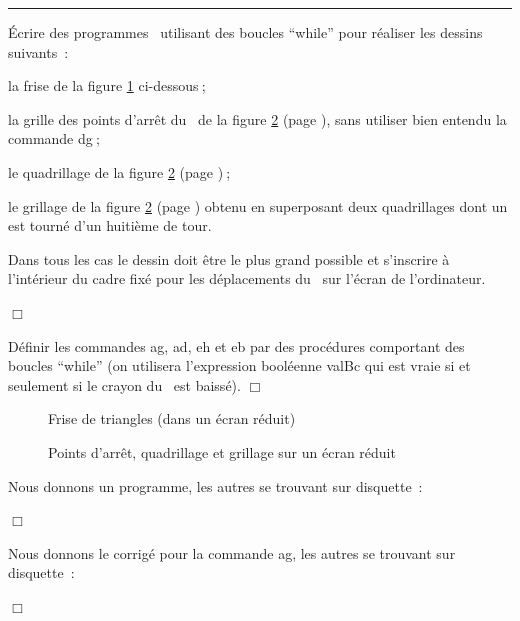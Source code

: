 \clearpage
\noindent \rule{137mm}{0.1mm} %
\begin{exercices}{Écrire des programmes \pascal\  utilisant des boucles ``while'' pour réaliser les 
dessins suivants~:

\tiret  la frise de la figure \ref{fig:FriTri} ci-dessous$\:$;

\tiret  la grille des points d'arrêt du \robot\ de la figure \ref{fig:DgQuGr} (page \pageref{fig:DgQuGr}),
sans utiliser bien entendu la commande {\idt dg}$\:$;

\tiret  le quadrillage de la figure \ref{fig:DgQuGr} (page \pageref{fig:DgQuGr})$\:$;

\tiret  le grillage de la figure \ref{fig:DgQuGr} (page \pageref{fig:DgQuGr}) obtenu en superposant deux
qua\-dril\-la\-ges dont un est tourné d'un huitième de tour.

Dans tous les cas le dessin doit être le plus grand possible et s'inscrire à l'intérieur du cadre fixé pour les
déplacements du \robot\ sur l'écran de l'ordinateur.

\noindent $\Box$}\end{exercices}

\begin{exercice}{Définir les commandes {\idt ag},  {\idt ad},  {\idt eh} et  {\idt eb} par des procédures comportant
des boucles ``while'' (on utilisera l'expression booléenne {\idt valBc} qui est vraie si et
seulement si le crayon du \robot\ est baissé).
\noindent $\Box$}\end{exercice}

\begin{figure}[htbp]
 \caption{Frise de triangles (dans un écran réduit)}\label{fig:FriTri}
\end{figure}
\begin{figure}[htbp]
 \caption{Points d'arrêt, quadrillage et grillage sur un écran réduit}\label{fig:DgQuGr}
\end{figure}

\begin{corrige}{
Nous donnons un programme, les autres se trouvant sur disquette~:

\noindent $\Box$}\end{corrige}
\begin{corrige}{
Nous donnons le corrigé pour la commande {\idt ag}, les autres se trouvant sur disquette~:

\noindent $\Box$}\end{corrige}

